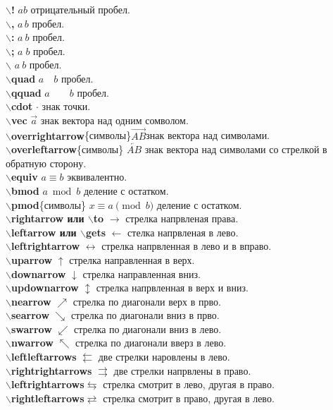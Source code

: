 \documentclass{article}
\newcommand{\bs}{$\backslash$}
\newcommand{\bd}[1]{{\bfseries #1}} %
\newcommand{\bb}[1]{\bd{\bs #1}} %
\begin{document}
\bb{!} $a\! b$ отрицательный пробел.\\
\bb{,} $a\, b$ пробел.\\
\bb{:} $a\: b$ пробел.\\
\bb{;} $a\; b$ пробел.\\
\bb{} $a\ b$ пробел.\\
\bb{quad} $a\quad b$ пробел.\\
\bb{qquad} $a\qquad b$ пробел.\\
\bb{cdot} $\cdot$ знак точки.\\
\bb{vec} $\vec a$ знак вектора над одним сомволом.\\
\bb{overrightarrow}\{символы\}$\overrightarrow{AB}$знак вектора над символами.\\
\bb{overleftarrow}\{символы\} $\overleftarrow{AB}$ знак вектора над символами
со стрелкой в обратную сторону.\\
\bb{equiv} $a\equiv b$ эквивалентно.\\
\bb{bmod} $a \bmod b$ деление с остатком.\\
\bb{pmod}\{символы\} $x \equiv a \pmod{b}$ деление с остатком.\\
\bb{rightarrow или \bs to} $\rightarrow$ стрелка напрвленая права.\\
\bb{leftarrow или \bs gets} $\leftarrow$ стелка напрвленая в лево.\\
\bb{leftrightarrow} $\leftrightarrow$ стрелка напрвленная в лево и в вправо.\\
\bb{uparrow} $\uparrow$ стрелка направленная в верх.\\
\bb{downarrow} $\downarrow$ стрелка направленная вниз.\\
\bb{updownarrow} $\updownarrow$ стрелка напрвленная в верх и вниз.\\
\bb{nearrow} $\nearrow$ стрелка  по диагонали верх в прво.\\
\bb{searrow} $\searrow$ стрелка по диагонали вниз в прво.\\
\bb{swarrow} $\swarrow$ стрелка по диагонали вниз в лево.\\
\bb{nwarrow} $\nwarrow$ стрелка по диагонали вверз в лево.\\
\bb{leftleftarrows} $\leftleftarrows$ две стрелки наровлены в лево.\\
\bb{rightrightarrows} $\rightrightarrows$ две стрелки напрвлены в право.\\
\bb{leftrightarrows}$\leftrightarrows$ стрелка смотрит в лево, другая в право.\\
\bb{rightleftarrows}$\rightleftarrows$ стрелка смотрит в право, другая в лево.\\
\end{document}
